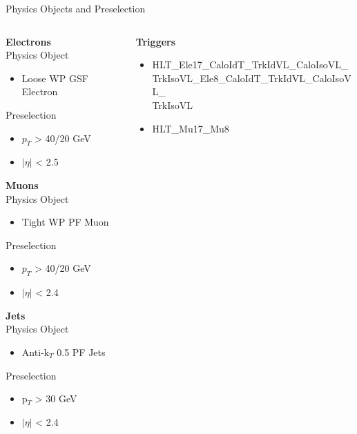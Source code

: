 \begin{frame}{Physics Objects and Preselection}
\begin{columns}
      \begin{column}{0.4\textwidth}
        \footnotesize
        \scriptsize
  {\bf Electrons}\\
  Physics Object
  \begin{itemize}
    \footnotesize
  \item
    Loose WP GSF Electron
    \end{itemize}
  Preselection
  \begin{itemize}
  \item
    $p_{T}$ > 40/20 GeV
  \item
    $|\eta|$ < 2.5
  \end{itemize}

  {\bf Muons}\\
  Physics Object
  \begin{itemize}
    \footnotesize
  \item
    Tight WP PF Muon
    \end{itemize}
  Preselection
  \begin{itemize}
  \item
    $p_{T}$ > 40/20 GeV
  \item
    $|\eta|$ < 2.4
  \end{itemize}
 {\bf Jets}\\
        Physics Object
        \begin{itemize}
        \item
          Anti-k$_T$ 0.5 PF Jets
        \end{itemize}
        
        Preselection
        \begin{itemize}
        \item
          p$_{T}$ > 30 GeV
        \item
          $|\eta|$ < 2.4
        \end{itemize}


  \end{column}
      \begin{column}{0.6\textwidth}
   \footnotesize

 {\bf Triggers}\\
  \begin{itemize}
        \item
          HLT\_Ele17\_CaloIdT\_TrkIdVL\_CaloIsoVL\_\\
          TrkIsoVL\_Ele8\_CaloIdT\_TrkIdVL\_CaloIsoVL\_\\
          TrkIsoVL
        \item
          HLT\_Mu17\_Mu8
\end{itemize}


\end{column}
\end{columns}
\end{frame}
